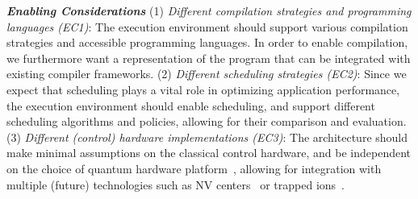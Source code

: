 \noindent\textit{\textbf{Enabling Considerations}}
(1) \textit{Different compilation strategies and programming languages (EC1)}: The execution environment should support various compilation strategies and accessible programming languages. 
In order to enable compilation, we furthermore want a representation of the program that can be integrated with existing compiler frameworks.
(2) \textit{Different scheduling strategies (EC2)}: Since we expect that scheduling plays a vital role in optimizing application performance, the execution environment should enable scheduling, and support different scheduling algorithms and policies, 
allowing for their comparison and evaluation.
(3) \textit{Different (control) hardware implementations (EC3)}: The architecture should make minimal assumptions on the classical control hardware, and be independent on the choice of quantum hardware platform~\cite{carlothesis},
allowing for integration with multiple (future) technologies such as NV centers~\cite{pompili2022experimental} or trapped ions~\cite{drmota2023robust}.

